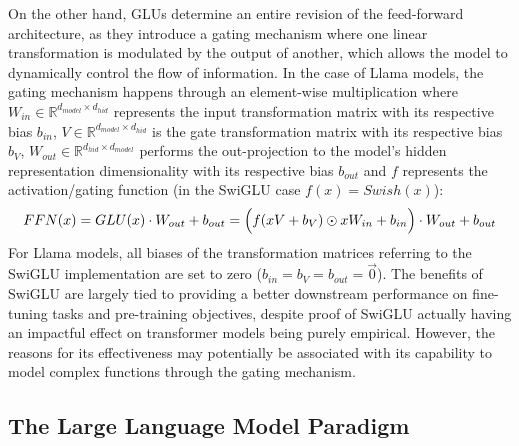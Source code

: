 On the other hand, GLUs determine an entire revision of the feed-forward architecture, as they introduce a gating mechanism where one linear transformation is modulated by the output of another, which allows the model to dynamically control the flow of information.
In the case of Llama models, the gating mechanism happens through an element-wise multiplication where $W_{in} \in \mathbb{R}^{d_{model} \times d_{hid}}$ represents the input transformation matrix with its respective bias $b_{in}$, $V \in \mathbb{R}^{d_{model} \times d_{hid}}$ is the gate transformation matrix with its respective bias $b_{V}$, $W_{out} \in \mathbb{R}^{d_{hid} \times d_{model}}$ performs the out-projection to the model's hidden representation dimensionality with its respective bias $b_{out}$ and $f$ represents the activation/gating function (in the SwiGLU case $f(x) = Swish(x)$):
\begin{equation}
    \label{eq:background_ffnn}
    FFN(x) = GLU(x) \cdot W_{out} + b_{out} 
    = \Bigl( f(xV + b_V) \odot xW_{in} + b_{in} \Bigr) \cdot W_{out} + b_{out}
\end{equation}
For Llama models, all biases of the transformation matrices referring to the SwiGLU implementation are set to zero ($b_{in} = b_V = b_{out} = \vec 0$).
The benefits of SwiGLU are largely tied to providing a better downstream performance on fine-tuning tasks and pre-training objectives, despite proof of SwiGLU actually having an impactful effect on transformer models being purely empirical.
However, the reasons for its effectiveness may potentially be associated with its capability to model complex functions through the gating mechanism. 

\subsection{The Large Language Model Paradigm}

